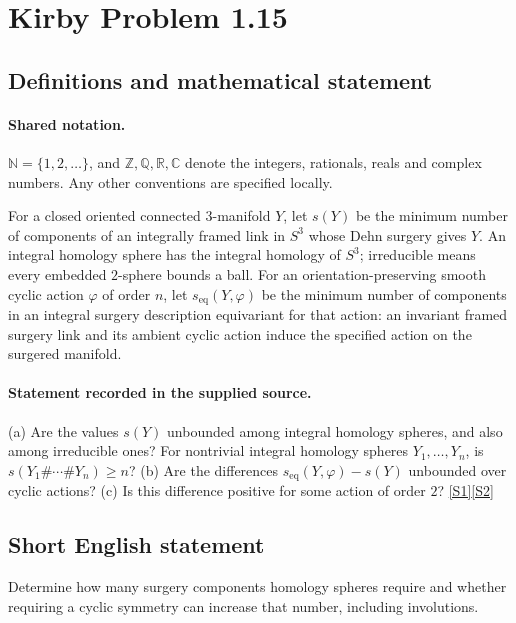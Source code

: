 \documentclass[11pt]{article}
\newcommand{\sref}[2]{\hyperlink{source:#1:#2}{[S#2]}}
\begin{document}
\section{Kirby Problem 1.15}\label{statement}

\subsection{Definitions and mathematical statement}

\paragraph{Shared notation.}$\mathbb N=\{1,2,\ldots\}$, and $\mathbb Z,\mathbb Q,\mathbb R,\mathbb C$ denote the integers, rationals, reals and complex numbers. Any other conventions are specified locally.


For a closed oriented connected $3$-manifold $Y$, let $s(Y)$ be the minimum number of components of an integrally framed link in $S^3$ whose Dehn surgery gives $Y$. An integral homology sphere has the integral homology of $S^3$; irreducible means every embedded $2$-sphere bounds a ball. For an orientation-preserving smooth cyclic action $\varphi$ of order $n$, let $s_{\mathrm{eq}}(Y,\varphi)$ be the minimum number of components in an integral surgery description equivariant for that action: an invariant framed surgery link and its ambient cyclic action induce the specified action on the surgered manifold.
\paragraph{Statement recorded in the supplied source.}
(a) Are the values $s(Y)$ unbounded among integral homology spheres, and also among irreducible ones? For nontrivial integral homology spheres $Y_1,\ldots,Y_n$, is $s(Y_1\#\cdots\#Y_n)\geq n$? (b) Are the differences $s_{\mathrm{eq}}(Y,\varphi)-s(Y)$ unbounded over cyclic actions? (c) Is this difference positive for some action of order $2$? \sref{statement}{1}\sref{statement}{2}
\subsection{Short English statement}
Determine how many surgery components homology spheres require and whether requiring a cyclic symmetry can increase that number, including involutions.
\end{document}
